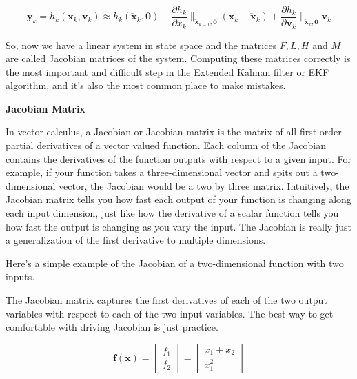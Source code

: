 \begin{equation}
\mathbf{y}_k = h_k(\mathbf{x}_k, \mathbf{v}_k) \approx h_k(\check{\mathbf{x}}_k, \mathbf{0}) + \frac{\partial h_k}{\partial x_k} \|_{\check{\mathbf{x}}_{k-1}, \mathbf{0}} (\mathbf{x}_k-\check{\mathbf{x}}_k) + \frac{\partial h_k}{\partial \mathbf{v}_k} \|_{\check{\mathbf{x}}_k, \mathbf{0}} \mathbf{v}_k
\end{equation}

 So, now we have a linear system in
state space and the matrices $F, L, H$ and $M$ are called Jacobian
matrices of the system. Computing these matrices correctly is the most important and difficult step in the Extended Kalman filter or EKF algorithm, and it's also the most common
place to make mistakes. 

\begin{framed}
\theoremstyle{remark}
\begin{remark}{\textbf{Jacobian Matrix}}

In vector calculus, a Jacobian or Jacobian matrix is the matrix of all
first-order partial derivatives of a vector valued function. Each column of the Jacobian
contains the derivatives of the function outputs with
respect to a given input. For example, if your function takes a three-dimensional vector and
spits out a two-dimensional vector, the Jacobian would be
a two by three matrix. Intuitively, the Jacobian matrix
tells you how fast each output of your function is changing
along each input dimension, just like how the derivative
of a scalar function tells you how fast the output is
changing as you vary the input. The Jacobian is really
just a generalization of the first derivative
to multiple dimensions. 

Here's a simple example
of the Jacobian of a two-dimensional function with two inputs. 


The Jacobian matrix captures
the first derivatives of each of the two output variables with respect
to each of the two input variables. The best way to get comfortable with
driving Jacobian is just practice. 

\begin{equation}
\mathbf{f}(\mathbf{x}) = 
\begin{bmatrix}
f_1 \\
f_2
\end{bmatrix} = 
\begin{bmatrix}
x_1 + x_2 \\
x_{1}^2
\end{bmatrix}
\end{equation}


\end{remark}
\end{framed}

